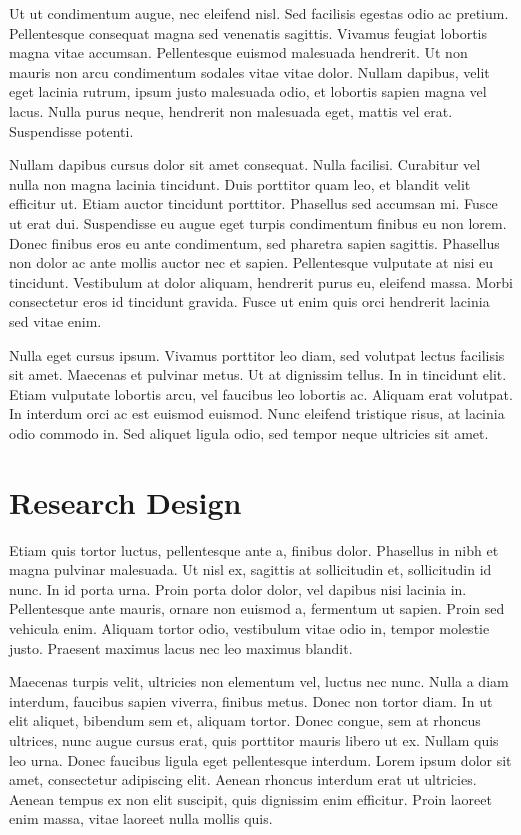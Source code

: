 \documentclass[
  12pt,
]{article}
\begin{document}
Ut ut condimentum augue, nec eleifend nisl. Sed facilisis egestas odio
ac pretium. Pellentesque consequat magna sed venenatis sagittis. Vivamus
feugiat lobortis magna vitae accumsan. Pellentesque euismod malesuada
hendrerit. Ut non mauris non arcu condimentum sodales vitae vitae dolor.
Nullam dapibus, velit eget lacinia rutrum, ipsum justo malesuada odio,
et lobortis sapien magna vel lacus. Nulla purus neque, hendrerit non
malesuada eget, mattis vel erat. Suspendisse potenti.

Nullam dapibus cursus dolor sit amet consequat. Nulla facilisi.
Curabitur vel nulla non magna lacinia tincidunt. Duis porttitor quam
leo, et blandit velit efficitur ut. Etiam auctor tincidunt porttitor.
Phasellus sed accumsan mi. Fusce ut erat dui. Suspendisse eu augue eget
turpis condimentum finibus eu non lorem. Donec finibus eros eu ante
condimentum, sed pharetra sapien sagittis. Phasellus non dolor ac ante
mollis auctor nec et sapien. Pellentesque vulputate at nisi eu
tincidunt. Vestibulum at dolor aliquam, hendrerit purus eu, eleifend
massa. Morbi consectetur eros id tincidunt gravida. Fusce ut enim quis
orci hendrerit lacinia sed vitae enim.

Nulla eget cursus ipsum. Vivamus porttitor leo diam, sed volutpat lectus
facilisis sit amet. Maecenas et pulvinar metus. Ut at dignissim tellus.
In in tincidunt elit. Etiam vulputate lobortis arcu, vel faucibus leo
lobortis ac. Aliquam erat volutpat. In interdum orci ac est euismod
euismod. Nunc eleifend tristique risus, at lacinia odio commodo in. Sed
aliquet ligula odio, sed tempor neque ultricies sit amet.

\section{Research Design}\label{research-design}

Etiam quis tortor luctus, pellentesque ante a, finibus dolor. Phasellus
in nibh et magna pulvinar malesuada. Ut nisl ex, sagittis at
sollicitudin et, sollicitudin id nunc. In id porta urna. Proin porta
dolor dolor, vel dapibus nisi lacinia in. Pellentesque ante mauris,
ornare non euismod a, fermentum ut sapien. Proin sed vehicula enim.
Aliquam tortor odio, vestibulum vitae odio in, tempor molestie justo.
Praesent maximus lacus nec leo maximus blandit.

Maecenas turpis velit, ultricies non elementum vel, luctus nec nunc.
Nulla a diam interdum, faucibus sapien viverra, finibus metus. Donec non
tortor diam. In ut elit aliquet, bibendum sem et, aliquam tortor. Donec
congue, sem at rhoncus ultrices, nunc augue cursus erat, quis porttitor
mauris libero ut ex. Nullam quis leo urna. Donec faucibus ligula eget
pellentesque interdum. Lorem ipsum dolor sit amet, consectetur
adipiscing elit. Aenean rhoncus interdum erat ut ultricies. Aenean
tempus ex non elit suscipit, quis dignissim enim efficitur. Proin
laoreet enim massa, vitae laoreet nulla mollis quis.
\end{document}
